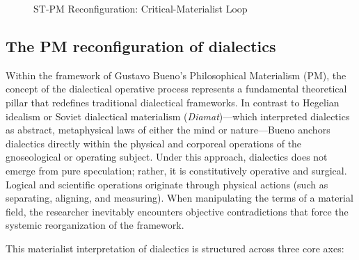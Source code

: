 \documentclass[11pt, a4paper]{article}
\begin{document}
\begin{figure}[h]
\begin{center}
\end{center} \vspace{-3ex}
\caption{ST-PM Reconfiguration: Critical-Materialist Loop}
\end{figure}



\subsection*{The PM reconfiguration of dialectics}

Within the framework of Gustavo Bueno's Philosophical Materialism (PM), the concept of the dialectical operative process represents a fundamental theoretical pillar that redefines traditional dialectical frameworks. In contrast to Hegelian idealism or Soviet dialectical materialism (\textit{Diamat})---which interpreted dialectics as abstract, metaphysical laws of either the mind or nature---Bueno anchors dialectics directly within the physical and corporeal operations of the gnoseological or operating subject. Under this approach, dialectics does not emerge from pure speculation; rather, it is constitutively operative and surgical. Logical and scientific operations originate through physical actions (such as separating, aligning, and measuring). When manipulating the terms of a material field, the researcher inevitably encounters objective contradictions that force the systemic reorganization of the framework.

This materialist interpretation of dialectics is structured across three core axes:
\end{document}
